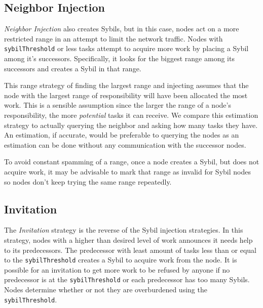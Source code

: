 \documentclass[11pt,conference]{IEEEtran}
\begin{document}



\subsection{Neighbor Injection}
\label{sec:strat-neighbor}
\textit{Neighbor Injection} also creates Sybils, but in this case, nodes act on a more restricted range in an attempt to limit the network traffic.
Nodes with \texttt{sybilThreshold} or less tasks attempt to acquire more work by placing a Sybil among it's successors.
Specifically, it looks for the biggest range among its successors and creates a Sybil in that range.

This range strategy of finding the largest range and injecting assumes that the node with the largest range of responsibility will have been allocated the most work.
This is a sensible assumption since the larger the range of a node's responsibility, the more \textit{potential} tasks it can receive. 
We compare this estimation strategy to actually querying the neighbor and asking how many tasks they have.
An estimation, if accurate, would be preferable to querying the nodes as an estimation can be done without any communication with the successor nodes.

To avoid constant spamming of a range, once a node creates a Sybil, but does not acquire work, it may be advisable to mark that range as invalid for Sybil nodes so nodes don't keep trying the same range repeatedly. 


\subsection{Invitation}
The \textit{Invitation} strategy is the reverse of the Sybil injection strategies.
In  this strategy, nodes with a higher than desired level of work announces it needs help to its predecessors.
The predecessor with least amount of tasks less than or equal to the \texttt{sybilThreshold} creates a Sybil to acquire work from the node.
It is possible for an invitation to get more work to be refused by anyone if no  predecessor is at the \texttt{sybilThreshold} or each predecessor has too many Sybils.
Nodes determine whether or not they are overburdened using the \texttt{sybilThreshold}.
\end{document}
